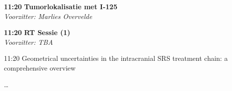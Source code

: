 \documentclass[a4paper,10pt]{report}
\begin{document}
\begin{multicols*}{3}

\begin{packed_enum}
\item[\textbf{11:20}]\textbf{Tumorlokalisatie met I-125}\\\textit{Voorzitter: Marlies Overvelde}
\end{packed_enum} %


\begin{packed_enum}
\item[\textbf{11:20}] \textbf{RT Sessie (1)}\\\textit{Voorzitter: TBA}
\item[11:20] Geometrical uncertainties in the intracranial SRS treatment chain: a comprehensive overview
\item[] \ldots\itemauthor{\ldots}
\end{packed_enum} %



\end{multicols*}
\end{document}
